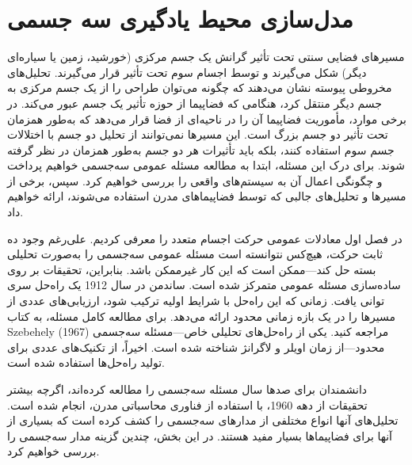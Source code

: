 \chapter{مدل‌سازی محیط یادگیری سه‌ جسمی}
مسیرهای فضایی سنتی تحت تأثیر گرانش یک جسم مرکزی (خورشید، زمین یا سیاره‌ای دیگر) شکل می‌گیرند و توسط اجسام سوم تحت تأثیر قرار می‌گیرند. تحلیل‌های مخروطی پیوسته نشان می‌دهند که چگونه می‌توان طراحی را از یک جسم مرکزی به جسم دیگر منتقل کرد، هنگامی که فضاپیما از حوزه تأثیر یک جسم عبور می‌کند. در برخی موارد، مأموریت فضاپیما آن را در ناحیه‌ای از فضا قرار می‌دهد که به‌طور همزمان تحت تأثیر دو جسم بزرگ است. این مسیرها نمی‌توانند از تحلیل دو جسم با اختلالات جسم سوم استفاده کنند، بلکه باید تأثیرات هر دو جسم به‌طور همزمان در نظر گرفته شوند. برای درک این مسئله، ابتدا به مطالعه مسئله عمومی سه‌جسمی خواهیم پرداخت و چگونگی اعمال آن به سیستم‌های واقعی را بررسی خواهیم کرد. سپس، برخی از مسیرها و تحلیل‌های جالبی که توسط فضاپیماهای مدرن استفاده می‌شوند، ارائه خواهیم داد.

در فصل اول معادلات عمومی حرکت اجسام متعدد را معرفی کردیم. علی‌رغم وجود ده ثابت حرکت، هیچ‌کس نتوانسته است مسئله عمومی سه‌جسمی را به‌صورت تحلیلی بسته حل کند—ممکن است که این کار غیرممکن باشد. بنابراین، تحقیقات بر روی ساده‌سازی مسئله عمومی متمرکز شده است. ساندمن در سال 1912 یک راه‌حل سری توانی یافت. زمانی که این راه‌حل با شرایط اولیه ترکیب شود، ارزیابی‌های عددی از مسیرها را در یک بازه زمانی محدود ارائه می‌دهد. برای مطالعه کامل مسئله، به کتاب Szebehely (1967) مراجعه کنید. یکی از راه‌حل‌های تحلیلی خاص—مسئله سه‌جسمی محدود—از زمان اویلر و لاگرانژ شناخته شده است. اخیراً، از تکنیک‌های عددی برای تولید راه‌حل‌ها استفاده شده است.

دانشمندان برای صدها سال مسئله سه‌جسمی را مطالعه کرده‌اند، اگرچه بیشتر تحقیقات از دهه 1960، با استفاده از فناوری محاسباتی مدرن، انجام شده است. تحلیل‌های آنها انواع مختلفی از مدارهای سه‌جسمی را کشف کرده است که بسیاری از آنها برای فضاپیماها بسیار مفید هستند. در این بخش، چندین گزینه مدار سه‌جسمی را بررسی خواهیم کرد.




